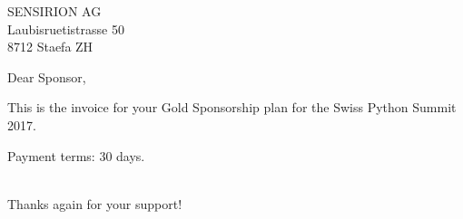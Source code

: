 \documentclass[SN,11pt,enlargefirstpage=true,sps]{scrlttr2}
\begin{document}
\begin{letter}{SENSIRION AG\\Laubisruetistrasse 50\\8712 Staefa ZH}

  \opening{Dear Sponsor,}

  This is the invoice for your Gold Sponsorship plan for the Swiss Python Summit 2017.

  \begin{invoice}{0}%
  \end{invoice}

  Payment terms: 30 days.

  \closing{\\Thanks again for your support!}

\end{letter}
\end{document}

